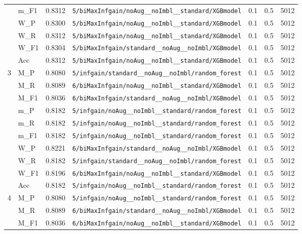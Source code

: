\begin{table}[htbp]
\begin{tabular}{|c|l|c|>{\ttfamily\footnotesize}p{7.2cm}|c|c|c|}
 & m\_F1 & 0.8312 & \texttt{5/biMaxInfgain/noAug\_\_noImbl\_\_standard/XGBmodel} & 0.1 & 0.5  & 5012 \\ 
 & W\_P & 0.8300 & \texttt{5/biMaxInfgain/noAug\_\_noImbl\_\_standard/XGBmodel} & 0.1 & 0.5  & 5012 \\ 
 & W\_R & 0.8312 & \texttt{5/biMaxInfgain/noAug\_\_noImbl\_\_standard/XGBmodel} & 0.1 & 0.5  & 5012 \\ 
 & W\_F1 & 0.8304 & \texttt{5/biMaxInfgain/standard\_\_noAug\_\_noImbl/XGBmodel} & 0.1 & 0.5  & 5012 \\ 
 & Acc & 0.8312 & \texttt{5/biMaxInfgain/noAug\_\_noImbl\_\_standard/XGBmodel} & 0.1 & 0.5  & 5012 \\ 
\hline
\multirow{10}{*}{3} & M\_P & 0.8080 & \texttt{5/infgain/standard\_\_noAug\_\_noImbl/random\_forest} & 0.1 & 0.5  & 5012 \\ 
 & M\_R & 0.8089 & \texttt{6/biMaxInfgain/noAug\_\_noImbl\_\_standard/XGBmodel} & 0.1 & 0.5  & 5012 \\ 
 & M\_F1 & 0.8036 & \texttt{6/biMaxInfgain/standard\_\_noAug\_\_noImbl/XGBmodel} & 0.1 & 0.5  & 5012 \\ 
 & m\_P & 0.8182 & \texttt{5/infgain/noAug\_\_noImbl\_\_standard/random\_forest} & 0.1 & 0.5  & 5012 \\ 
 & m\_R & 0.8182 & \texttt{5/infgain/noAug\_\_noImbl\_\_standard/random\_forest} & 0.1 & 0.5  & 5012 \\ 
 & m\_F1 & 0.8182 & \texttt{5/infgain/noAug\_\_noImbl\_\_standard/random\_forest} & 0.1 & 0.5  & 5012 \\ 
 & W\_P & 0.8221 & \texttt{6/biMaxInfgain/standard\_\_noAug\_\_noImbl/XGBmodel} & 0.1 & 0.5  & 5012 \\ 
 & W\_R & 0.8182 & \texttt{5/infgain/standard\_\_noAug\_\_noImbl/random\_forest} & 0.1 & 0.5  & 5012 \\ 
 & W\_F1 & 0.8196 & \texttt{6/biMaxInfgain/noAug\_\_noImbl\_\_standard/XGBmodel} & 0.1 & 0.5  & 5012 \\ 
 & Acc & 0.8182 & \texttt{5/infgain/noAug\_\_noImbl\_\_standard/random\_forest} & 0.1 & 0.5  & 5012 \\ 
\hline
\multirow{10}{*}{4} & M\_P & 0.8080 & \texttt{5/infgain/noAug\_\_noImbl\_\_standard/random\_forest} & 0.1 & 0.5  & 5012 \\ 
 & M\_R & 0.8089 & \texttt{6/biMaxInfgain/standard\_\_noAug\_\_noImbl/XGBmodel} & 0.1 & 0.5  & 5012 \\ 
 & M\_F1 & 0.8036 & \texttt{6/biMaxInfgain/noAug\_\_noImbl\_\_standard/XGBmodel} & 0.1 & 0.5  & 5012 \\ 

\end{tabular}
\end{table}
